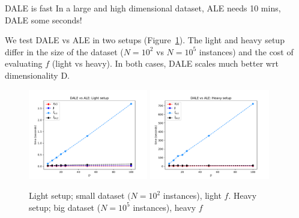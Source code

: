 \documentclass[final]{beamer}
\newlength{\sepwidth}
\newlength{\colwidth}
\newcommand{\separatorcolumn}{\begin{column}{\sepwidth}\end{column}}
\begin{document}
\begin{frame}[t]
\begin{columns}[t]
\begin{column}{\colwidth}
  \begin{block}{DALE is fast}
    In a large and high dimensional dataset, ALE needs 10 mins, DALE some seconds!

    We test DALE vs ALE in two setups
    (Figure~\ref{fig:efficiency}). The light and heavy setup differ in
    the size of the dataset (\(N=10^2\) vs \(N=10^5\) instances) and
    the cost of evaluating \(f\) (light vs heavy). In both cases, DALE
    scales much better wrt dimensionality D.
    \begin{figure}[ht] \centering
      \includegraphics[width=0.49\textwidth]{./../ACML-paper/images/case-1-plot-1.pdf}
      \includegraphics[width=0.49\textwidth]{./../ACML-paper/images/case-1-plot-2.pdf}
      \caption[Case-1-fig-1]{Light setup; small dataset
        \((N=10^2\) instances), light \(f\). Heavy setup; big dataset
        (\(N=10^5\) instances), heavy \(f\)}
      \label{fig:efficiency}
    \end{figure}
  \end{block}
\end{column} \separatorcolumn
\end{columns}


\end{frame}
\end{document}
